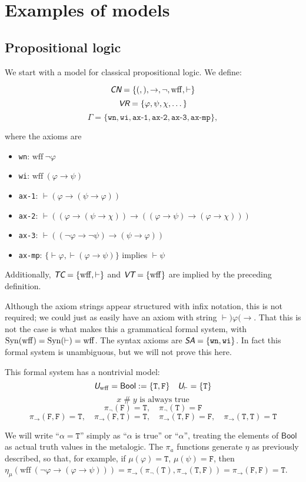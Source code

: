 \documentclass[runningheads,a4paper]{llncs}
\newcommand{\cn}{\textit{\textsf{CN}}} %
\newcommand{\vr}{\textit{\textsf{VR}}} %
\newcommand{\tc}{\textit{\textsf{TC}}} %
\newcommand{\vt}{\textit{\textsf{VT}}} %
\newcommand{\uv}{\textit{\textsf{U}}} %
\newcommand{\sa}{\textit{\textsf{SA}}} %
\newcommand{\vph}{\varphi}
\newcommand{\syn}{{\rm Syn}}
\newcommand{\fresh}{\mathbin{\#}}
\newcommand{\bool}{\textsf{Bool}}
\newcommand{\tT}{\texttt{T}}
\newcommand{\tF}{\texttt{F}}
\begin{document}
\section{Examples of models}\label{sec:ex}
\subsection{Propositional logic}\label{sec:prop}
We start with a model for classical propositional logic. We define:

\[\cn=\{{(},{)},\to,\lnot,\mathrm{wff},\vdash\}\]
\[\vr=\{\vph,\psi,\chi,\dots\}\]
\[\Gamma=\{\texttt{wn}, \texttt{wi}, \texttt{ax-1}, \texttt{ax-2}, \texttt{ax-3},\texttt{ax-mp}\},\]

where the axioms are
\begin{itemize}
  \item \texttt{wn}: $\mathrm{wff}\ \lnot\vph$
  \item \texttt{wi}: $\mathrm{wff}\ (\vph\to\psi)$
  \item \texttt{ax-1}: $\vdash(\vph\to(\psi\to\vph))$
  \item \texttt{ax-2}: $\vdash((\vph\to(\psi\to\chi))\to((\vph\to\psi)\to(\vph\to\chi)))$
  \item \texttt{ax-3}: $\vdash((\lnot\vph\to\lnot\psi)\to(\psi\to\vph))$
  \item \texttt{ax-mp}: $\{\vdash\vph,\vdash(\vph\to\psi)\}$ implies $\vdash\psi$
\end{itemize}

Additionally, $\tc=\{\mathrm{wff},\vdash\}$ and $\vt=\{\mathrm{wff}\}$ are implied by the preceding definition. 

Although the axiom strings appear structured with infix notation, this is not required; we could just as easily have an axiom with string $\vdash{)}\vph{(}\to$. That this is not the case is what makes this a grammatical formal system, with $\syn(\mathrm{wff})=\syn(\vdash)=\mathrm{wff}$. The syntax axioms are $\sa=\{\texttt{wn}, \texttt{wi}\}$. In fact this formal system is unambiguous, but we will not prove this here.

This formal system has a nontrivial model:
\[\uv_{\mathrm{wff}}=\bool:=\{\tT,\tF\}\quad\uv_{\vdash}=\{\tT\}\]
\[x\fresh y\mbox{ is always true}\]
\[\pi_\lnot(\tF)=\tT,\quad \pi_\lnot(\tT)=\tF\]
\[\pi_\to(\tF,\tF)=\tT,\quad \pi_\to(\tF,\tT)=\tT, \quad\pi_\to(\tT,\tF)=\tF,\quad \pi_\to(\tT,\tT)=\tT\]

We will write ``$\alpha=\tT$'' simply as ``$\alpha$ is true'' or ``$\alpha$'', treating the elements of $\bool$ as actual truth values in the metalogic. The $\pi_a$ functions generate $\eta$ as previously described, so that, for example, if $\mu(\vph)=\tT$, $\mu(\psi)=\tF$, then $\eta_\mu(\mathrm{wff}\ (\lnot\vph\to(\vph\to\psi))) = \pi_\to(\pi_\lnot(\tT),\pi_\to(\tT,\tF)) = \pi_\to(\tF,\tF) = \tT$.
\end{document}
